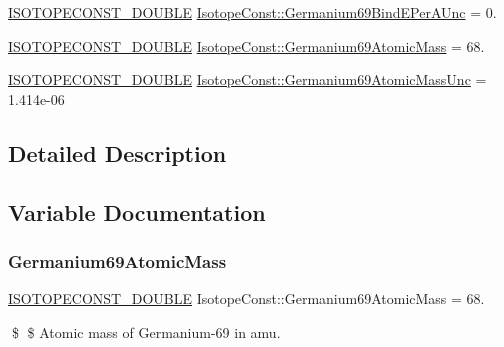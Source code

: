 \begin{DoxyCompactItemize}
\mbox{\hyperlink{group___isotope_const-_macros_ga8f45a7272ce02c0b4c65c44636ed719a}{I\+S\+O\+T\+O\+P\+E\+C\+O\+N\+S\+T\+\_\+\+D\+O\+U\+B\+LE}} \mbox{\hyperlink{group___isotope_const-_germanium-_ge69_ga1335918a5ef2cb0e3ac4001644a4e12c}{Isotope\+Const\+::\+Germanium69\+Bind\+E\+Per\+A\+Unc}} = 0.
\item 
\mbox{\hyperlink{group___isotope_const-_macros_ga8f45a7272ce02c0b4c65c44636ed719a}{I\+S\+O\+T\+O\+P\+E\+C\+O\+N\+S\+T\+\_\+\+D\+O\+U\+B\+LE}} \mbox{\hyperlink{group___isotope_const-_germanium-_ge69_gadef655cbdb08679833bd1f5b4d87da5b}{Isotope\+Const\+::\+Germanium69\+Atomic\+Mass}} = 68.
\item 
\mbox{\hyperlink{group___isotope_const-_macros_ga8f45a7272ce02c0b4c65c44636ed719a}{I\+S\+O\+T\+O\+P\+E\+C\+O\+N\+S\+T\+\_\+\+D\+O\+U\+B\+LE}} \mbox{\hyperlink{group___isotope_const-_germanium-_ge69_gaee1c2a87447e8aafaa5f13365a96b702}{Isotope\+Const\+::\+Germanium69\+Atomic\+Mass\+Unc}} = 1.\+414e-\/06
\end{DoxyCompactItemize}


\subsection{Detailed Description}


\subsection{Variable Documentation}
\mbox{\label{group___isotope_const-_germanium-_ge69_gadef655cbdb08679833bd1f5b4d87da5b}} 
\subsubsection{\texorpdfstring{Germanium69\+Atomic\+Mass}{Germanium69AtomicMass}}
{\footnotesize\ttfamily \mbox{\hyperlink{group___isotope_const-_macros_ga8f45a7272ce02c0b4c65c44636ed719a}{I\+S\+O\+T\+O\+P\+E\+C\+O\+N\+S\+T\+\_\+\+D\+O\+U\+B\+LE}} Isotope\+Const\+::\+Germanium69\+Atomic\+Mass = 68.}

\$ \$ Atomic mass of Germanium-\/69 in amu. \mbox{\label{group___isotope_const-_germanium-_ge69_gaee1c2a87447e8aafaa5f13365a96b702}} 
